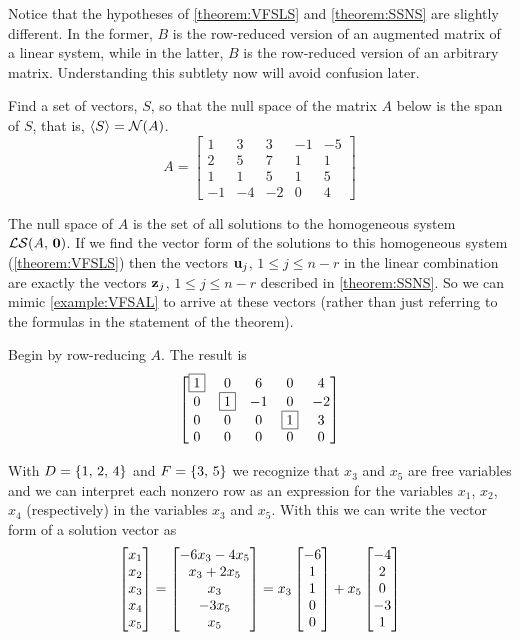 \documentclass{ximera}
\begin{document}
Notice that the hypotheses of \ref{theorem:VFSLS} and
\ref{theorem:SSNS} are slightly different.  In the former, $B$ is the
row-reduced version of an augmented matrix of a linear system, while
in the latter, $B$ is the row-reduced version of an arbitrary matrix.
Understanding this subtlety now will avoid confusion later.

\begin{example}
  Find a set of vectors, $S$, so that the null space of the matrix $A$
  below is the span of $S$, that is, $\left\langle S\right\rangle=\mathcal{N}\!\left(A\right)$.
  \[
    A=
    \begin{bmatrix}
      1 & 3 & 3 & -1 & -5\\
      2 & 5 & 7 & 1 & 1\\
      1 & 1 & 5 & 1 & 5\\
      -1 & -4 & -2 & 0 & 4
    \end{bmatrix}
  \]

  The null space of $A$ is the set of all solutions to the homogeneous
  system $\mathcal{LS}\!\left(A,\,\mathbf{0}\right)$.  If we find the vector form of the
  solutions to this homogeneous system (\ref{theorem:VFSLS}) then the
  vectors $\mathbf{u}_j$, $1\leq j\leq n-r$ in the linear combination
  are exactly the vectors $\mathbf{z}_j$, $1\leq j\leq n-r$ described in
  \ref{theorem:SSNS}.  So we can mimic \ref{example:VFSAL} to arrive
  at these vectors (rather than just referring to the formulas in the
  statement of the theorem).

  Begin by row-reducing $A$.  The result is
  \[
    \begin{bmatrix}
      \fbox{1} & 0 & 6 & 0 & 4\\
      0 & \fbox{1} & -1 & 0 & -2\\
      0 & 0 & 0 & \fbox{1} & 3\\
      0 & 0 & 0 & 0 & 0
    \end{bmatrix}
  \]

  With $D=\left\{1,\,2,\,4\right\}$ and $F=\left\{3,\,5\right\}$ we recognize that $x_3$
  and $x_5$ are free variables and we can interpret each nonzero row
  as an expression for the  variables $x_1$, $x_2$, $x_4$
  (respectively) in the  variables $x_3$ and $x_5$.  With this we
  can write the vector form of a solution vector as
  \[
    \begin{bmatrix}x_1\\x_2\\x_3\\x_4\\x_5\end{bmatrix}=
    \begin{bmatrix}-6x_3-4x_5\\x_3+2x_5\\x_3\\-3x_5\\x_5\end{bmatrix}=
    x_3\begin{bmatrix}-6\\1\\1\\0\\0\end{bmatrix}+
    x_5\begin{bmatrix}-4\\2\\0\\-3\\1\end{bmatrix}
  \]


\end{example}
\end{document}
